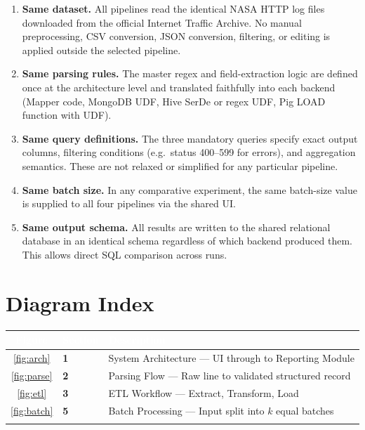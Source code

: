 \documentclass[11pt,a4paper]{article}
\begin{document}
\begin{enumerate}
  \item \textbf{Same dataset.} All pipelines read the identical NASA HTTP log files downloaded from the official Internet Traffic Archive. No manual preprocessing, CSV conversion, JSON conversion, filtering, or editing is applied outside the selected pipeline.

  \item \textbf{Same parsing rules.} The master regex and field-extraction logic are defined once at the architecture level and translated faithfully into each backend (Mapper code, MongoDB UDF, Hive SerDe or regex UDF, Pig LOAD function with UDF).

  \item \textbf{Same query definitions.} The three mandatory queries specify exact output columns, filtering conditions (e.g.\ status 400--599 for errors), and aggregation semantics. These are not relaxed or simplified for any particular pipeline.

  \item \textbf{Same batch size.} In any comparative experiment, the same batch-size value is supplied to all four pipelines via the shared UI.

  \item \textbf{Same output schema.} All results are written to the shared relational database in an identical schema regardless of which backend produced them. This allows direct SQL comparison across runs.
\end{enumerate}

\section{Diagram Index}

\begin{center}
\renewcommand{\arraystretch}{1.45}
\begin{tabular}{@{} c >{\bfseries}l l @{}}
\arrayrulecolor{PrimaryBlue!30}\toprule
\rowcolor{PrimaryBlue}
  \textcolor{white}{\textbf{Figure}} & \textcolor{white}{\textbf{Section}} & \textcolor{white}{\textbf{Description}} \\
\midrule
\rowcolor{RowAlt}\ref{fig:arch}  & 1 & System Architecture --- UI through to Reporting Module \\
\ref{fig:parse} & 2 & Parsing Flow --- Raw line to validated structured record \\
\rowcolor{RowAlt}\ref{fig:etl}   & 3 & ETL Workflow --- Extract, Transform, Load \\
\ref{fig:batch} & 5 & Batch Processing --- Input split into $k$ equal batches \\
\arrayrulecolor{PrimaryBlue!30}\bottomrule
\end{tabular}
\end{center}
\end{document}
